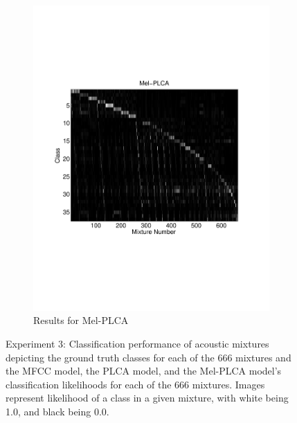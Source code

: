 \documentclass[a4paper,10pt,final]{ThesisStyle}
\begin{document}
\begin{figure}
\begin{subfigure}[b]{0.5\textwidth}
\includegraphics[width=0.99\textwidth]{images/mixture-melplca.pdf}
\caption{Results for Mel-PLCA}
\end{subfigure}%
\caption{Experiment 3: Classification performance of acoustic mixtures depicting the ground truth classes for each of the 666 mixtures and the MFCC model, the PLCA model, and the Mel-PLCA model's classification likelihoods for each of the 666 mixtures. Images represent likelihood of a class in a given mixture, with white being 1.0, and black being 0.0.}
\label{fig:mixture-images}
\end{figure}
\end{document}
